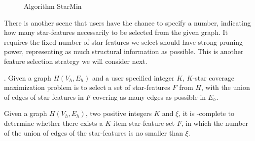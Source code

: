 \begin{figure}[tb!]
\vspace{2ex}
\begin{center}
{\small

\myhrule \vspace{-2ex}
\vspace{-2.5ex} \myhrule
}
\end{center}
\vspace{-4ex}
\caption{Algorithm StarMin} \label{star-min-alg}
\vspace{-3ex}
\end{figure}

There is another scene that users have the chance to specify a number, indicating how many star-features necessarily to be selected from the given graph. It requires the fixed number of star-features we select should have strong pruning power, representing as much structural information as possible. This is another feature selection strategy we will consider next.

. Given a graph $H(V_h, E_h)$ and a user specified integer $K$, $K$-star coverage maximization problem is to select a set of star-features $F$ from $H$, with the union of edges of star-features in $F$ covering as many edges as possible in $E_h$.

\begin{theorem}
\label{thm-k-star-max-complexity}
Given a graph $H(V_h, E_h)$, two positive integers $K$ and $\xi$, it is \NP-complete to determine whether there exists a $K$ item star-feature set $F$, in which the number of the union of edges of the star-features is no smaller than $\xi$.
\end{theorem}

